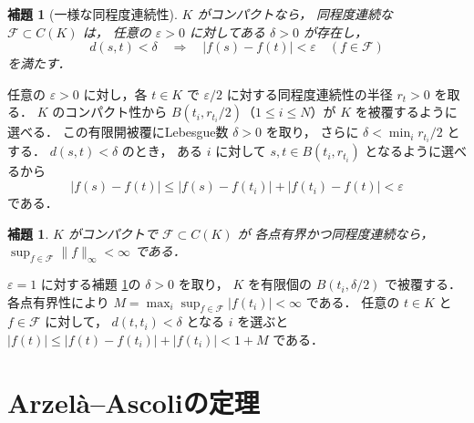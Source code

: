 \documentclass[a5paper,10pt,onecolumn]{jsarticle}
\makeatletter
\theoremstyle{mathnotetheorem}
\newtheorem{lemma}[theorem]{補題}
\renewcommand{\proofname}{証明}
\renewenvironment{proof}[1][\proofname]{%
  \par\pushQED{\qed}\normalfont\topsep4\p@\@plus2\p@\relax
  \trivlist\item[\hskip\labelsep\bfseries #1]\ignorespaces
}{\popQED\endtrivlist\@endpefalse}
\newcommand{\norm}[1]{\lVert #1\rVert}
\makeatother
\begin{document}
\begin{lemma}[一様な同程度連続性]\label{lem:uniform-equicont}
$K$ がコンパクトなら，
同程度連続な $\mathcal F\subset C(K)$ は，
任意の $\varepsilon>0$ に対してある $\delta>0$ が存在し，
\[
 d(s,t)<\delta
 \quad\Longrightarrow\quad |f(s)-f(t)|<\varepsilon
 \quad(f\in\mathcal F)
\]
を満たす．
\end{lemma}
\begin{proof}
任意の $\varepsilon>0$ に対し，各 $t\in K$ で
$\varepsilon/2$ に対する同程度連続性の半径 $r_t>0$ を取る．
$K$ のコンパクト性から
$B(t_i,r_{t_i}/2)$（$1\le i\le N$）が $K$ を被覆するように選べる．
この有限開被覆にLebesgue数 $\delta>0$ を取り，
さらに $\delta<\min_i r_{t_i}/2$ とする．
$d(s,t)<\delta$ のとき，
ある $i$ に対して $s,t\in B(t_i,r_{t_i})$
となるように選べるから
\[
 |f(s)-f(t)|\le|f(s)-f(t_i)|+|f(t_i)-f(t)|<\varepsilon
\]
である．
\end{proof}

\begin{lemma}\label{lem:pointwise-to-uniform}
$K$ がコンパクトで $\mathcal F\subset C(K)$ が
各点有界かつ同程度連続なら，
$\sup_{f\in\mathcal F}\norm f_\infty<\infty$
である．
\end{lemma}
\begin{proof}
$\varepsilon=1$ に対する補題
\ref{lem:uniform-equicont}の $\delta>0$ を取り，
$K$ を有限個の $B(t_i,\delta/2)$ で被覆する．
各点有界性により
$M=\max_i\sup_{f\in\mathcal F}|f(t_i)|<\infty$ である．
任意の $t\in K$ と $f\in\mathcal F$ に対して，
$d(t,t_i)<\delta$ となる $i$ を選ぶと
$|f(t)|\le|f(t)-f(t_i)|+|f(t_i)|<1+M$ である．
\end{proof}

\section{Arzel\`a--Ascoliの定理}
\end{document}
